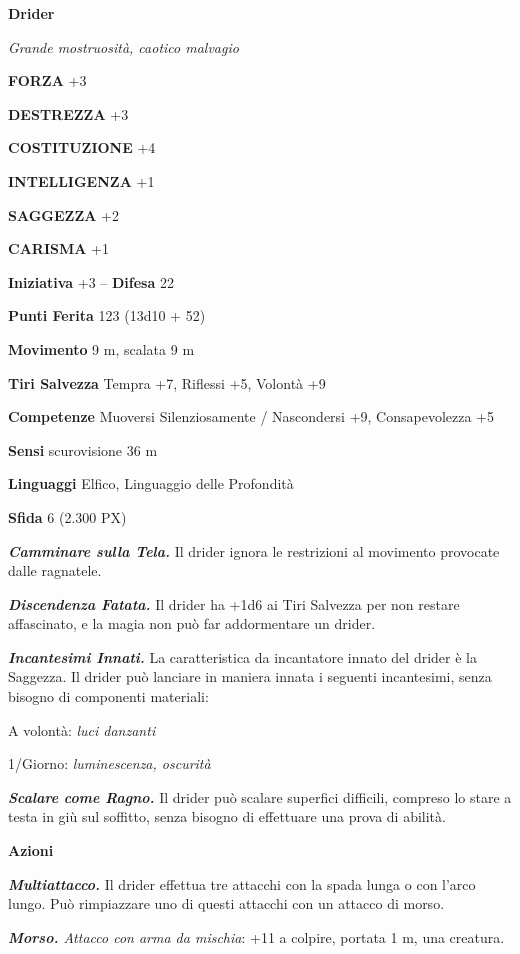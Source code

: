 \begin{multicols}{2}
	\medskip{}\textbf{Drider}

	\textit{Grande mostruosità, caotico malvagio}

	\textbf{FORZA} +3

	\textbf{DESTREZZA} +3

	\textbf{COSTITUZIONE} +4

	\textbf{INTELLIGENZA} +1

	\textbf{SAGGEZZA} +2

	\textbf{CARISMA} +1

	\textbf{Iniziativa} +3 -- \textbf{Difesa} 22

	\textbf{Punti Ferita} 123 (13d10 + 52)

	\textbf{Movimento} 9 m, scalata 9 m

	\textbf{Tiri Salvezza} Tempra +7, Riflessi +5, Volontà +9

	\textbf{Competenze} Muoversi Silenziosamente / Nascondersi +9, Consapevolezza +5

	\textbf{Sensi} scurovisione 36 m

	\textbf{Linguaggi} Elfico, Linguaggio delle Profondità

	\textbf{Sfida} 6 (2.300 PX)

	\textit{\textbf{Camminare sulla Tela.}} Il drider ignora le restrizioni al movimento provocate dalle ragnatele.

	\textit{\textbf{Discendenza Fatata.}} Il drider ha +1d6 ai Tiri Salvezza per non restare affascinato, e la magia non può far addormentare un drider.

	\textit{\textbf{Incantesimi Innati.}} La caratteristica da incantatore innato del drider è la Saggezza. Il drider può lanciare in maniera innata i seguenti incantesimi, senza bisogno di componenti materiali:

	A volontà: \textit{luci danzanti}

	1/Giorno: \textit{luminescenza, oscurità}

	\textit{\textbf{Scalare come Ragno.}} Il drider può scalare superfici difficili, compreso lo stare a testa in giù sul soffitto, senza bisogno di effettuare una prova di abilità.

	\textbf{Azioni}

	\textit{\textbf{Multiattacco.}} Il drider effettua tre attacchi con la spada lunga o con l'arco lungo. Può rimpiazzare uno di questi attacchi con un attacco di morso.



	\textit{\textbf{Morso.} Attacco con arma da mischia}: +11 a colpire, portata 1 m, una creatura.


\end{multicols}
